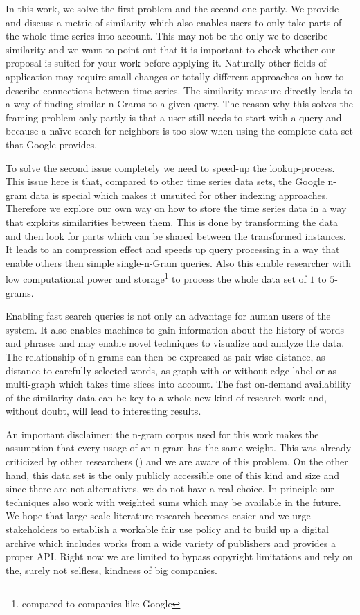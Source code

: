 In this work, we solve the first problem and the second one partly. We provide and discuss a metric of similarity which also enables users to only take parts of the whole time series into account. This may not be the only we to describe similarity and we want to point out that it is important to check whether our proposal is suited for your work before applying it. Naturally other fields of application may require small changes or totally different approaches on how to describe connections between time series. The similarity measure directly leads to a way of finding similar n-Grams to a given query. The reason why this solves the framing problem only partly is that a user still needs to start with a query and because a na{\"\i}ve search for neighbors is too slow when using the complete data set that Google provides.

To solve the second issue completely we need to speed-up the lookup-process. This issue here is that, compared to other time series data sets, the Google n-gram data is special which makes it unsuited for other indexing approaches. Therefore we explore our own way on how to store the time series data in a way that exploits similarities between them. This is done by transforming the data and then look for parts which can be shared between the transformed instances. It leads to an compression effect and speeds up query processing in a way that enable others then simple single-n-Gram queries. Also this enable researcher with low computational power and storage\footnote{compared to companies like Google} to process the whole data set of $1$ to $5$-grams.

Enabling fast search queries is not only an advantage for human users of the system. It also enables machines to gain information about the history of words and phrases and may enable novel techniques to visualize and analyze the data. The relationship of n-grams can then be expressed as pair-wise distance, as distance to carefully selected words, as graph with or without edge label or as multi-graph which takes time slices into account. The fast on-demand availability of the similarity data can be key to a whole new kind of research work and, without doubt, will lead to interesting results.

An important disclaimer: the n-gram corpus used for this work makes the assumption that every usage of an n-gram has the same weight. This was already criticized by other researchers (\cite{countbad}) and we are aware of this problem. On the other hand, this data set is the only publicly accessible one of this kind and size and since there are not alternatives, we do not have a real choice. In principle our techniques also work with weighted sums which may be available in the future. We hope that large scale literature research becomes easier and we urge stakeholders to establish a workable fair use policy and to build up a digital archive which includes works from a wide variety of publishers and provides a proper API\@. Right now we are limited to bypass copyright limitations and rely on the, surely not selfless, kindness of big companies.

